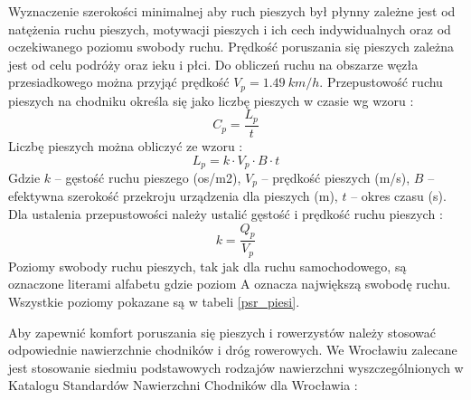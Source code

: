 \documentclass[twoside,12pt]{article}
\begin{document}
	 Wyznaczenie szerokości minimalnej aby ruch pieszych był płynny zależne jest od natężenia ruchu pieszych, motywacji pieszych i ich cech indywidualnych oraz od oczekiwanego poziomu swobody ruchu. Prędkość poruszania się pieszych zależna jest od celu podróży oraz ieku i płci. Do obliczeń ruchu na obszarze węzła przesiadkowego można przyjąć prędkość $V_p = 1.49 \ \si{km/h}$. Przepustowość ruchu pieszych na chodniku określa się jako liczbę pieszych w czasie wg wzoru \cite{standardy_wroclaw}:
	 \begin{equation}
	 C_p = \frac{L_p}{t}
	 \end{equation}
	 Liczbę pieszych można obliczyć ze wzoru \cite{standardy_wroclaw}:
	 \begin{equation}
	 L_p = k \cdot V_p \cdot B \cdot t
	 \end{equation}
	 Gdzie $k$ -- gęstość ruchu pieszego (os/m2), $V_p$ -- prędkość pieszych (m/s), $B$ -- efektywna szerokość przekroju urządzenia dla pieszych (m), $t$ -- okres czasu (s). 
	 Dla ustalenia przepustowości należy ustalić gęstość i prędkość ruchu pieszych \cite{standardy_wroclaw}:
	 \begin{equation}
	 k=\frac{Q_p}{V_p}
	 \end{equation}
	 Poziomy swobody ruchu pieszych, tak jak dla ruchu samochodowego, są oznaczone literami alfabetu gdzie poziom A oznacza największą swobodę ruchu. Wszystkie poziomy pokazane są w tabeli \ref{psr_piesi}.
	 
	 
	 Aby zapewnić komfort poruszania się pieszych i rowerzystów należy stosować odpowiednie nawierzchnie chodników i dróg rowerowych. We Wrocławiu zalecane jest stosowanie siedmiu podstawowych rodzajów nawierzchni wyszczególnionych w Katalogu Standardów Nawierzchni Chodników dla Wrocławia \cite{standardy_chodnik}:
\end{document}
